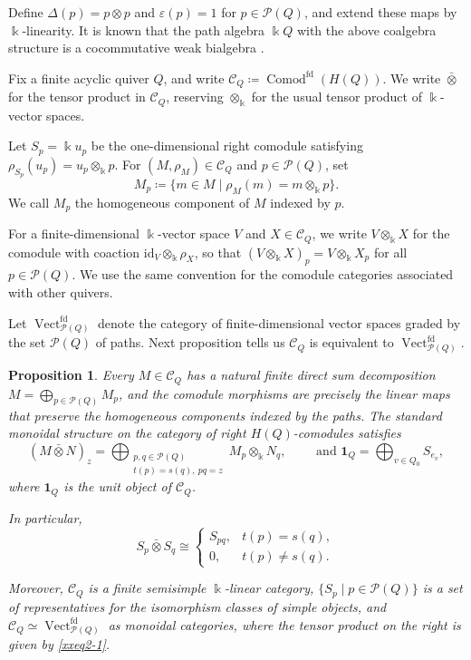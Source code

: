 \documentclass{amsart}
\DeclareMathOperator{\Vect}{Vect}
\newcommand{\id}{\mathrm{id}}
\newcommand{\btensor}{\mathbin{\bar{\otimes}}}
\newtheorem{proposition}[theorem]{Proposition}
\theoremstyle{definition}
\theoremstyle{remark}
\numberwithin{equation}{section}
\begin{document}
Define $\Delta(p)=p\otimes p$ and $\varepsilon(p)=1$ for
$p\in\mathcal P(Q)$, and extend these maps by $\Bbbk$-linearity.
It is known that the path algebra $\Bbbk Q$ with the above coalgebra structure is a cocommutative weak bialgebra
\cite[Lemma~2.1(1)]{ZZ2022}.

Fix a finite acyclic quiver $Q$, and write
$\mathcal C_Q\coloneqq\operatorname{Comod}^{\mathrm{fd}}(H(Q))$.
We write $\btensor$ for the tensor product in $\mathcal C_Q$,
reserving $\otimes_{\Bbbk}$ for the usual tensor product of $\Bbbk$-vector spaces.

Let $S_p=\Bbbk u_p$ be the one-dimensional right comodule satisfying
$\rho_{S_p}(u_p)=u_p\otimes_{\Bbbk} p$. For $(M,\rho_M)\in\mathcal C_Q$ and $p\in\mathcal P(Q)$, set
\[
M_p\coloneqq\{m\in M\mid\rho_M(m)=m\otimes_{\Bbbk} p\}.
\]
We call $M_p$ the homogeneous component of $M$ indexed by $p$.

For a finite-dimensional $\Bbbk$-vector space $V$ and $X\in\mathcal C_Q$, we write
$V\otimes_{\Bbbk}X$ for the comodule with coaction
$\id_V\otimes_{\Bbbk}\rho_X$, so that $(V\otimes_{\Bbbk}X)_p=V\otimes_{\Bbbk}X_p$ for all
$p\in\mathcal P(Q)$.
We use the same convention for the comodule categories associated with other
quivers.

Let $\Vect_{\mathcal P(Q)}^{\mathrm{fd}}$ denote the category of finite-dimensional
vector spaces graded by the set $\mathcal P(Q)$ of paths. Next proposition tells us 
$\mathcal C_Q$ is equivalent to $\Vect_{\mathcal P(Q)}^{\mathrm{fd}}$.

\begin{proposition}
\label{xxprop2.1}
Every $M\in\mathcal C_Q$ has a natural finite direct sum decomposition
$M=\bigoplus_{p\in\mathcal P(Q)}M_p$,
and the comodule morphisms are precisely the linear maps that preserve the homogeneous components indexed by the paths.
The standard monoidal structure on the category of right $H(Q)$-comodules satisfies
\begin{equation}\label{xxeq2-1}
(M\btensor N)_z
=
\bigoplus_{\substack{p,q\in\mathcal P(Q)\\t(p)=s(q),\ pq=z}}
M_p\otimes_{\Bbbk}N_q,
\qquad \text{ and }
\mathbf1_Q=\bigoplus_{v\in Q_0}S_{e_v},
\end{equation}
where $\mathbf1_Q$ is the unit object of $\mathcal C_Q$.

In particular,
\[
S_p\btensor S_q
\cong
\begin{cases}
S_{pq},&t(p)=s(q),\\
0,&t(p)\neq s(q).
\end{cases}
\]

Moreover, $\mathcal C_Q$ is a finite semisimple $\Bbbk$-linear category,
$\{S_p\mid p\in\mathcal P(Q)\}$ is a set of representatives for the isomorphism classes of simple objects, and
$\mathcal C_Q\simeq\Vect_{\mathcal P(Q)}^{\mathrm{fd}}$
as monoidal categories, where the tensor product on the right is given by
\eqref{xxeq2-1}.
\end{proposition}
\end{document}

